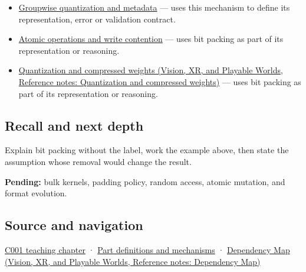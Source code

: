 \begin{itemize}
\item
  \hyperref[appendix-638204c40e8b]{Groupwise quantization and metadata} --- uses this mechanism to define its representation, error or validation contract.
\item
  \hyperref[appendix-e12d1b03fefb]{Atomic operations and write contention} --- uses bit packing as part of its representation or reasoning.
\item
  \href{../07-Vision-XR-and-Playable-Worlds/main.pdf\#nameddest=appendix-fdc7879e8bf2}{Quantization and compressed weights (Vision, XR, and Playable Worlds, Reference notes: Quantization and compressed weights)} --- uses bit packing as part of its representation or reasoning.
\end{itemize}

\subsection{Recall and next depth}\label{appendix-1f9963e1a5d1-recall-and-next-depth}

Explain bit packing without the label, work the example above, then state the assumption whose removal would change the result.

\textbf{Pending:} bulk kernels, padding policy, random access, atomic mutation, and format evolution.

\subsection{Source and navigation}\label{appendix-1f9963e1a5d1-source-and-navigation}

\hyperref[01-foundations-i-ch001-from-a-signal-to-an-interpretation]{C001 teaching chapter} · \hyperref[appendix-fd090d982a15]{Part definitions and mechanisms} · \href{../07-Vision-XR-and-Playable-Worlds/main.pdf\#nameddest=appendix-4ad47bdd269a}{Dependency Map (Vision, XR, and Playable Worlds, Reference notes: Dependency Map)}
